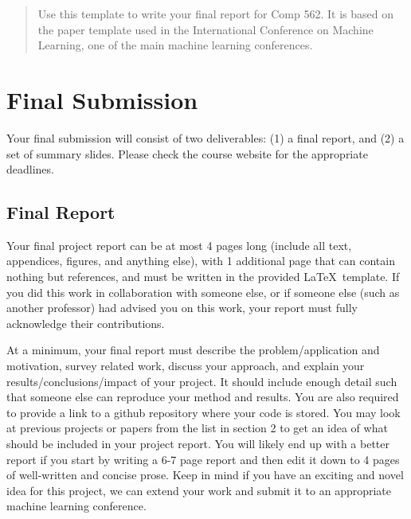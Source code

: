 \documentclass{article}
\begin{document}
 


\begin{abstract} 
Use this template to write your final report for Comp 562. It is based on the paper template used in the International Conference on Machine Learning, one of the main machine learning conferences.
\end{abstract} 


\section{Final Submission}

Your final submission will consist of two deliverables:  (1) a final report, and (2) a set of summary slides. Please check the course website for the appropriate deadlines. 

\subsection{Final Report}

Your final project report can be at most 4 pages long (include all text, appendices, figures, and anything else), with 1 additional page that can contain nothing but references, and must be written in the provided \LaTeX\ template. If you did this work in collaboration with someone else, or if someone else (such as another professor) had advised you on this work, your report must fully acknowledge their contributions. 

At a minimum, your final report must describe the problem/application and motivation, survey related work, discuss your approach, and explain your results/conclusions/impact of your project. It should include enough detail such that someone else can reproduce your method and results. You are also required to provide a link to a github repository where your code is stored. You may look at previous projects or papers from the list in section 2 to get an idea of what should be included in your project report. You will likely end up with a better report if you start by writing a 6-7 page report and then edit it down to 4 pages of well-written and concise prose. Keep in mind if you have an exciting and novel idea for this project, we can extend your work and submit it to an appropriate machine learning conference. 
\end{document}
